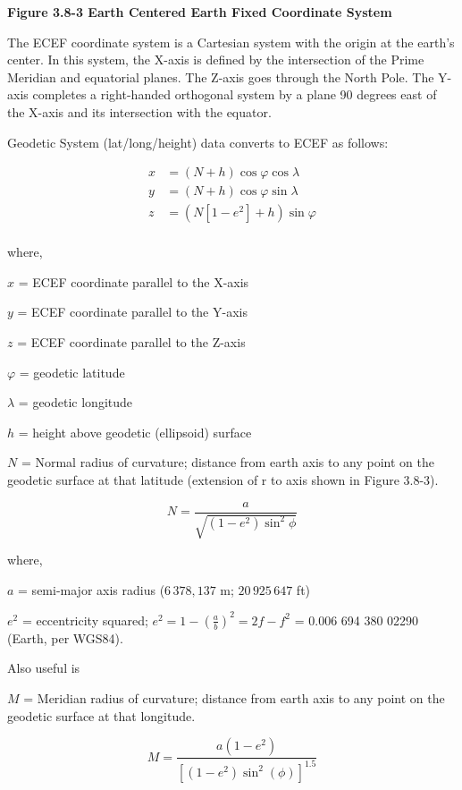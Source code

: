 \documentclass[
]{book}
\begin{document}
\textbf{Figure 3.8-3 Earth Centered Earth Fixed Coordinate System}

The ECEF coordinate system is a Cartesian system with the origin at the earth's center. In this system, the X-axis is defined by the intersection of the Prime Meridian and equatorial planes. The Z-axis goes through the North Pole. The Y-axis completes a right-handed orthogonal system by a plane 90 degrees east of the X-axis and its intersection with the equator.

Geodetic System (lat/long/height) data converts to ECEF as follows:

\[
\begin{align}
x &= \left(N + h \right)\cos{\varphi}\cos{\lambda} \\
y &= \left(N + h \right)\cos{\varphi}\sin{\lambda} \\
z &= \left(N \left[ 1-e^2 \right] + h \right) \sin{\varphi} \\
\end{align}
\]

where,

\(x\) = ECEF coordinate parallel to the X-axis

\(y\) = ECEF coordinate parallel to the Y-axis

\(z\) = ECEF coordinate parallel to the Z-axis

\(\varphi\) = geodetic latitude

\(\lambda\) = geodetic longitude

\(h\) = height above geodetic (ellipsoid) surface

\(N\) = Normal radius of curvature; distance from earth axis to any point on the geodetic surface at that latitude (extension of r to axis shown in Figure 3.8-3).

\[N = \frac{a}{\sqrt{ \left(1 - e^2 \right) \sin^{2}{\phi}}}\]

where,

\(a\) = semi-major axis radius (\(6\,378,137\) m; \(20\,925\,647\) ft)

\(e^2\) = eccentricity squared; \(e^{2} = 1 - \left( \frac{a}{b} \right)^{2} = 2f - f^{2}\) = 0.006 694 380 02290 (Earth, per WGS84).

Also useful is

\(M\) = Meridian radius of curvature; distance from earth axis to any point on the geodetic surface at that longitude.

\[M = \frac{a \left(1 - e^{2} \right)}{\left\lbrack \left( 1 - e^{2} \right)  \sin^{2}(\phi) \right\rbrack^{1.5}}\]
\end{document}
